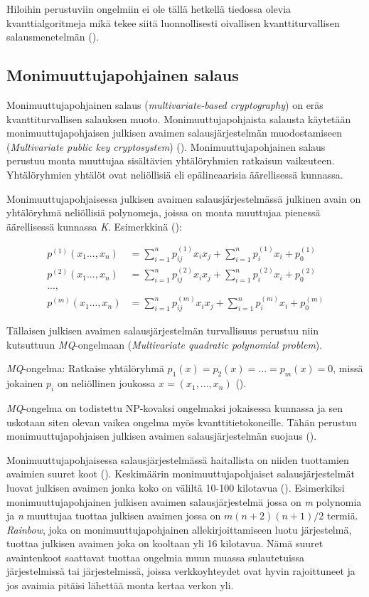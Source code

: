 Hiloihin perustuviin ongelmiin ei ole tällä hetkellä tiedossa olevia kvanttialgoritmeja mikä tekee siitä luonnollisesti oivallisen kvanttiturvallisen salausmenetelmän (\cite{regev2006lattice}).

\subsection{Monimuuttujapohjainen salaus}
Monimuuttujapohjainen salaus (\emph{multivariate-based cryptography}) on eräs kvanttiturvallisen salauksen muoto. Monimuuttujapohjaista salausta käytetään monimuuttujapohjaisen julkisen avaimen salausjärjestelmän muodostamiseen (\emph{Multivariate public key cryptosystem}) (\cite{Ding2009}). Monimuuttujapohjainen salaus perustuu monta muuttujaa sisältävien yhtälöryhmien ratkaisun vaikeuteen. Yhtälöryhmien yhtälöt ovat neliöllisiä eli epälineaarisia äärellisessä kunnassa.

Monimuuttujapohjaisessa julkisen avaimen salausjärjestelmässä julkinen avain on yhtälöryhmä neliöllisiä polynomeja, joissa on monta muuttujaa pienessä äärellisessä kunnassa \emph{K}. Esimerkkinä (\cite{8012305}): 

    \begin{align*}
        p^{(1)}(x_{1}...,x_{n}) &= \sum_{i=1}^{n} p_{ij}^{(1)}x_{i}x_ {j}+\sum_{i=1}^{n}p_ {i}^{(1)}x_{i}+p_ {0}^{(1)} \\
        p^{(2)}(x_{1}...,x_{n}) &= \sum_{i=1}^{n} p_{ij}^{(2)}x_{i}x_ {j}+\sum_{i=1}^{n}p_ {i}^{(2)}x_{i}+p_ {0}^{(2)} \\
        ..., \\
        p^{(m)}(x_{1}...,x_{n}) &= \sum_{i=1}^{n} p_{ij}^{(m)}x_{i}x_ {j}+\sum_{i=1}^{n}p_ {i}^{(m)}x_{i}+p_ {0}^{(m)}
    \end{align*}
    
Tällaisen julkisen avaimen salausjärjestelmän turvallisuus perustuu niin kutsuttuun \emph{MQ}-ongelmaan (\emph{Multivariate quadratic polynomial problem}).

\emph{MQ}-ongelma: Ratkaise yhtälöryhmä $p_{1}(x) = p_{2}(x) = ... = p_ {m}(x) = 0$, missä jokainen $p_{i}$ on neliöllinen joukossa $x = (x_{1}, ..., x_{n})$ (\cite{Ding2009}).

\emph{MQ}-ongelma on todistettu NP-kovaksi ongelmaksi jokaisessa kunnassa ja sen uskotaan siten olevan vaikea ongelma myös kvanttitietokoneille. Tähän perustuu monimuuttujapohjaisen julkisen avaimen salausjärjestelmän suojaus (\cite{8012305}).

Monimuuttujapohjaisessa salausjärjestelmässä haitallista on niiden tuottamien avaimien suuret koot (\cite{Ding2009}). Keskimäärin monimuuttujapohjaiset salausjärjestelmät luovat julkisen avaimen jonka koko on väliltä 10-100 kilotavua (\cite{8012305}). Esimerkiksi monimuuttujapohjainen julkisen avaimen salausjärjestelmä jossa on \emph{m} polynomia ja \emph{n} muuttujaa tuottaa julkisen avaimen jossa on $m(n+2)(n+1)/2$ termiä. \emph{Rainbow}, joka on monimuuttujapohjainen allekirjoittamiseen luotu järjestelmä, tuottaa julkisen avaimen joka on kooltaan yli 16 kilotavua. Nämä suuret avaintenkoot saattavat tuottaa ongelmia muun muassa sulautetuissa järjestelmissä tai järjestelmissä, joissa verkkoyhteydet ovat hyvin rajoittuneet ja jos avaimia pitäisi lähettää monta kertaa verkon yli.

